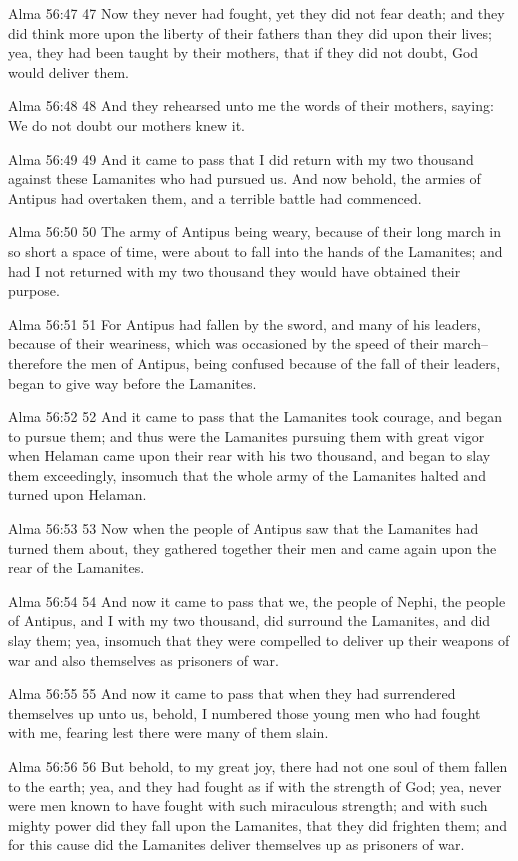 Alma 56:47
 47 Now they never had fought, yet they did not fear death; and
they did think more upon the liberty of their fathers than they
did upon their lives; yea, they had been taught by their mothers,
that if they did not doubt, God would deliver them.

Alma 56:48
 48 And they rehearsed unto me the words of their mothers,
saying: We do not doubt our mothers knew it.

Alma 56:49
 49 And it came to pass that I did return with my two thousand
against these Lamanites who had pursued us. And now behold, the
armies of Antipus had overtaken them, and a terrible battle had
commenced.

Alma 56:50
 50 The army of Antipus being weary, because of their long march
in so short a space of time, were about to fall into the hands of
the Lamanites; and had I not returned with my two thousand they
would have obtained their purpose.

Alma 56:51
 51 For Antipus had fallen by the sword, and many of his leaders,
because of their weariness, which was occasioned by the speed of
their march--therefore the men of Antipus, being confused because
of the fall of their leaders, began to give way before the
Lamanites.

Alma 56:52
 52 And it came to pass that the Lamanites took courage, and
began to pursue them; and thus were the Lamanites pursuing them
with great vigor when Helaman came upon their rear with his two
thousand, and began to slay them exceedingly, insomuch that the
whole army of the Lamanites halted and turned upon Helaman.

Alma 56:53
 53 Now when the people of Antipus saw that the Lamanites had
turned them about, they gathered together their men and came
again upon the rear of the Lamanites.

Alma 56:54
 54 And now it came to pass that we, the people of Nephi, the
people of Antipus, and I with my two thousand, did surround the
Lamanites, and did slay them; yea, insomuch that they were
compelled to deliver up their weapons of war and also themselves
as prisoners of war.

Alma 56:55
 55 And now it came to pass that when they had surrendered
themselves up unto us, behold, I numbered those young men who had
fought with me, fearing lest there were many of them slain.

Alma 56:56
 56 But behold, to my great joy, there had not one soul of them
fallen to the earth; yea, and they had fought as if with the
strength of God; yea, never were men known to have fought with
such miraculous strength; and with such mighty power did they
fall upon the Lamanites, that they did frighten them; and for
this cause did the Lamanites deliver themselves up as prisoners
of war.

